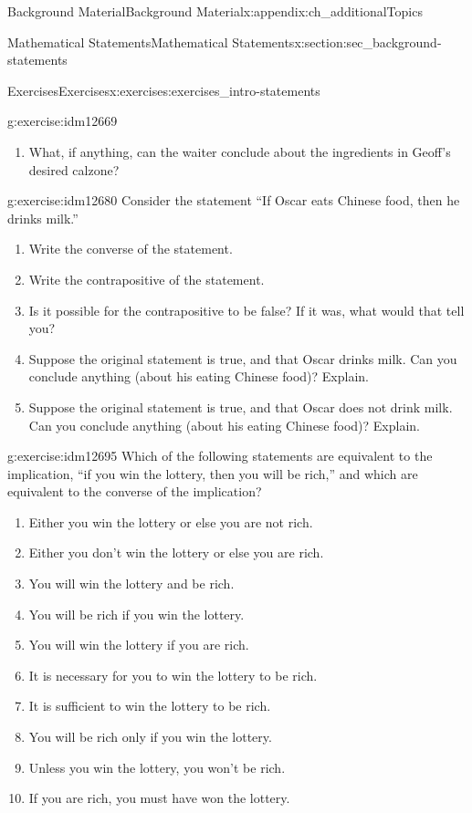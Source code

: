 \documentclass[oneside,10pt,]{book}
\numberwithin{equation}{chapter}
\begin{document}
\begin{appendixptx}{Background Material}{}{Background Material}{}{}{x:appendix:ch_additionalTopics}
\begin{sectionptx}{Mathematical Statements}{}{Mathematical Statements}{}{}{x:section:sec_background-statements}
\begin{exercises-subsection}{Exercises}{}{Exercises}{}{}{x:exercises:exercises_intro-statements}
\begin{divisionexercise}{3}{}{}{g:exercise:idm12669}
\begin{enumerate}[label=(\alph*)]
\item{}What, if anything, can the waiter conclude about the ingredients in Geoff's desired calzone?%
\end{enumerate}
\end{divisionexercise}%
\begin{divisionexercise}{4}{}{}{g:exercise:idm12680}%
Consider the statement ``If Oscar eats Chinese food, then he drinks milk.''%
%
\begin{enumerate}[label=(\alph*)]
\item{}Write the converse of the statement.%
\item{}Write the contrapositive of the statement.%
\item{}Is it possible for the contrapositive to be false? If it was, what would that tell you?%
\item{}Suppose the original statement is true, and that Oscar drinks milk. Can you conclude anything (about his eating Chinese food)? Explain.%
\item{}Suppose the original statement is true, and that Oscar does not drink milk. Can you conclude anything (about his eating Chinese food)? Explain.%
\end{enumerate}
\end{divisionexercise}%
\begin{divisionexercise}{5}{}{}{g:exercise:idm12695}%
Which of the following statements are equivalent to the implication, ``if you win the lottery, then you will be rich,'' and which are equivalent to the converse of the implication?%
%
\begin{enumerate}[label=(\alph*)]
\item{}Either you win the lottery or else you are not rich.%
\item{}Either you don't win the lottery or else you are rich.%
\item{}You will win the lottery and be rich.%
\item{}You will be rich if you win the lottery.%
\item{}You will win the lottery if you are rich.%
\item{}It is necessary for you to win the lottery to be rich.%
\item{}It is sufficient to win the lottery to be rich.%
\item{}You will be rich only if you win the lottery.%
\item{}Unless you win the lottery, you won't be rich.%
\item{}If you are rich, you must have won the lottery.%

\end{enumerate}
\end{divisionexercise}
\end{exercises-subsection}
\end{sectionptx}
\end{appendixptx}
\end{document}
